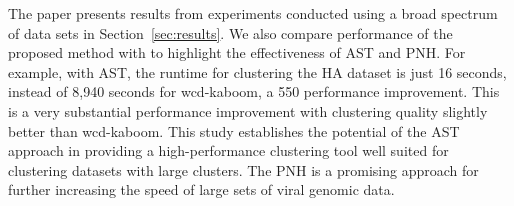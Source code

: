 The paper presents results from experiments conducted using a broad
spectrum of data sets in Section~\ref{sec:results}.  We also compare
performance of the proposed method with  to highlight
the effectiveness of AST and PNH.  For example, with AST, the runtime
for clustering the HA dataset is just 16 seconds, instead of 8,940
seconds for {\ttfamily wcd-kaboom}, a 550\texttimes\/ performance
improvement.  This is a very substantial performance improvement with
clustering quality slightly better than {\ttfamily wcd-kaboom}.  This
study establishes the potential of the AST approach in providing a
high-performance clustering tool well suited for clustering datasets
with large clusters.  The PNH is a promising approach for further
increasing the speed of large sets of viral genomic data.






